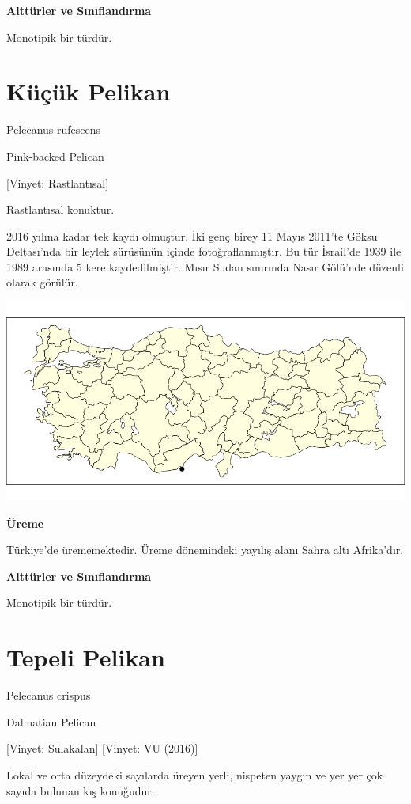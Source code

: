 \documentclass[
  letterpaper,
  DIV=11,
  numbers=noendperiod]{scrreprt}
\begin{document}
\textbf{Alttürler ve Sınıflandırma}

Monotipik bir türdür.

\section{Küçük Pelikan}\label{kuxfcuxe7uxfck-pelikan}

Pelecanus rufescens

Pink-backed Pelican

{[}Vinyet: Rastlantısal{]}

Rastlantısal konuktur.

2016 yılına kadar tek kaydı olmuştur. İki genç birey 11 Mayıs 2011'te
Göksu Deltası'nda bir leylek sürüsünün içinde fotoğraflanmıştır. Bu tür
İsrail'de 1939 ile 1989 arasında 5 kere kaydedilmiştir. Mısır Sudan
sınırında Nasır Gölü'nde düzenli olarak görülür.

\includegraphics{images/harita_Pelecanus_rufescens.png}

\textbf{Üreme}

Türkiye'de ürememektedir. Üreme dönemindeki yayılış alanı Sahra altı
Afrika'dır.

\textbf{Alttürler ve Sınıflandırma}

Monotipik bir türdür.

\section{Tepeli Pelikan}\label{tepeli-pelikan}

Pelecanus crispus

Dalmatian Pelican

{[}Vinyet: Sulakalan{]} {[}Vinyet: VU (2016){]}

Lokal ve orta düzeydeki sayılarda üreyen yerli, nispeten yaygın ve yer
yer çok sayıda bulunan kış konuğudur.
\end{document}

